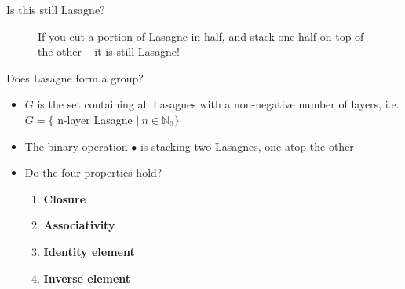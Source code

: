 \documentclass{beamer}
\begin{document}
\begin{frame}{Is this still Lasagne?}
\begin{figure}
\begin{subfigure}{.4\textwidth}
        \end{subfigure}
        \vskip 0.75cm
        \caption{\label{fig:lasagane-stacked}If you cut a portion of Lasagne in half, and stack one half on top of the other -- it is still Lasagne!}
    \end{figure}
\end{frame}

\begin{frame}{Does Lasagne form a group?}
    \begin{itemize}
        \item $G$ is the set containing all Lasagnes with a non-negative number of layers, i.e. $G = \{$ n-layer Lasagne $|\ n \in \mathbb{N}_{0}\}$
        \item The binary operation $\bullet$ is stacking two Lasagnes, one atop the other
        \vskip 1cm
        \item Do the four properties hold?
        \begin{enumerate}
            \item \textbf{Closure}
            \item \textbf{Associativity}
            \item \textbf{Identity element}
            \item \textbf{Inverse element}
        \end{enumerate}
    \end{itemize}
\end{frame}
\end{document}
